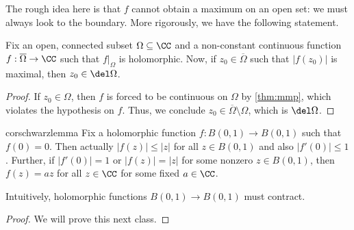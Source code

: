 The rough idea here is that $f$ cannot obtain a maximum on an open set: we must always look to the boundary. More rigorously, we have the following statement.
\begin{corollary} \label{cor:mmp}
	Fix an open, connected subset $\Omega\subseteq\CC$ and a non-constant continuous function $f:\overline\Omega\to\CC$ such that $f|_\Omega$ is holomorphic. Now, if $z_0\in\overline\Omega$ such that $|f(z_0)|$ is maximal, then $z_0\in\del\Omega$.
\end{corollary}
\begin{proof}
	If $z_0\in\Omega$, then $f$ is forced to be continuous on $\Omega$ by \autoref{thm:mmp}, which violates the hypothesis on $f$. Thus, we conclude $z_0\in\overline\Omega\setminus\Omega$, which is $\del\Omega$.
\end{proof}
\begin{restatable}{cor}{schwarzlemma}
	Fix a holomorphic function $f:B(0,1)\to B(0,1)$ such that $f(0)=0$. Then actually $|f(z)|\le|z|$ for all $z\in B(0,1)$ and also $|f'(0)|\le1$. Further, if $|f'(0)|=1$ or $|f(z)|=|z|$ for some nonzero $z\in B(0,1)$, then $f(z)=az$ for all $z\in\CC$ for some fixed $a\in\CC$.
\end{restatable}
Intuitively, holomorphic functions $B(0,1)\to B(0,1)$ must contract.
\begin{proof}
	We will prove this next class.
\end{proof}